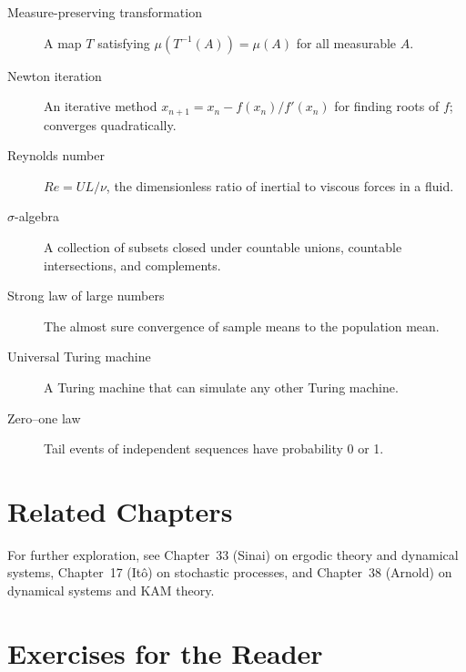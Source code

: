 \begin{description}
    \item[Measure-preserving transformation] A map $T$ satisfying $\mu(T^{-1}(A)) = \mu(A)$ for all measurable $A$.
    \item[Newton iteration] An iterative method $x_{n+1} = x_n - f(x_n)/f'(x_n)$ for finding roots of $f$; converges quadratically.
    \item[Reynolds number] $Re = UL/\nu$, the dimensionless ratio of inertial to viscous forces in a fluid.
    \item[$\sigma$-algebra] A collection of subsets closed under countable unions, countable intersections, and complements.
    \item[Strong law of large numbers] The almost sure convergence of sample means to the population mean.
    \item[Universal Turing machine] A Turing machine that can simulate any other Turing machine.
    \item[Zero--one law] Tail events of independent sequences have probability 0 or 1.
\end{description}

\section{Related Chapters}
For further exploration, see Chapter~33 (Sinai) on ergodic theory and dynamical systems, Chapter~17 (It\^o) on stochastic processes, and Chapter~38 (Arnold) on dynamical systems and KAM theory.

\section*{Exercises for the Reader}

